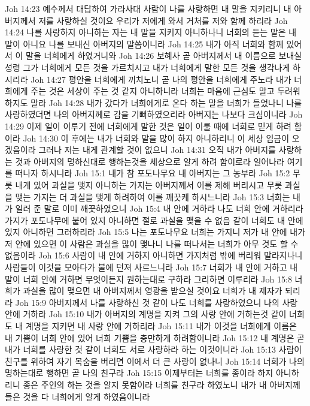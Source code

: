 Joh 14:23  예수께서 대답하여 가라사대 사람이 나를 사랑하면 내 말을 지키리니 내 아버지께서 저를 사랑하실 것이요 우리가 저에게 와서 거처를 저와 함께 하리라
Joh 14:24  나를 사랑하지 아니하는 자는 내 말을 지키지 아니하나니 너희의 듣는 말은 내 말이 아니요 나를 보내신 아버지의 말씀이니라
Joh 14:25  내가 아직 너희와 함께 있어서 이 말을 너희에게 하였거니와
Joh 14:26  보혜사 곧 아버지께서 내 이름으로 보내실 성령 그가 너희에게 모든 것을 가르치시고 내가 너희에게 말한 모든 것을 생각나게 하시리라
Joh 14:27  평안을 너희에게 끼치노니 곧 나의 평안을 너희에게 주노라 내가 너희에게 주는 것은 세상이 주는 것 같지 아니하니라 너희는 마음에 근심도 말고 두려워하지도 말라
Joh 14:28  내가 갔다가 너희에게로 온다 하는 말을 너희가 들었나니 나를 사랑하였더면 나의 아버지께로 감을 기뻐하였으리라 아버지는 나보다 크심이니라
Joh 14:29  이제 일이 이루기 전에 너희에게 말한 것은 일이 이룰 때에 너희로 믿게 하려 함이라
Joh 14:30  이 후에는 내가 너희와 말을 많이 하지 아니하리니 이 세상 임금이 오겠음이라 그러나 저는 내게 관계할 것이 없으니
Joh 14:31  오직 내가 아버지를 사랑하는 것과 아버지의 명하신대로 행하는것을 세상으로 알게 하려 함이로라 일어나라 여기를 떠나자 하시니라
Joh 15:1  내가 참 포도나무요 내 아버지는 그 농부라
Joh 15:2  무릇 내게 있어 과실을 맺지 아니하는 가지는 아버지께서 이를 제해 버리시고 무릇 과실을 맺는 가지는 더 과실을 맺게 하려하여 이를 깨끗케 하시느니라
Joh 15:3  너희는 내가 일러 준 말로 이미 깨끗하였으니
Joh 15:4  내 안에 거하라 나도 너희 안에 거하리라 가지가 포도나무에 붙어 있지 아니하면 절로 과실을 맺을 수 없음 같이 너희도 내 안에 있지 아니하면 그러하리라
Joh 15:5  나는 포도나무요 너희는 가지니 저가 내 안에 내가 저 안에 있으면 이 사람은 과실을 많이 맺나니 나를 떠나서는 너희가 아무 것도 할 수 없음이라
Joh 15:6  사람이 내 안에 거하지 아니하면 가지처럼 밖에 버리워 말라지나니 사람들이 이것을 모아다가 불에 던져 사르느니라
Joh 15:7  너희가 내 안에 거하고 내 말이 너희 안에 거하면 무엇이든지 원하는대로 구하라 그리하면 이루리라
Joh 15:8  너희가 과실을 많이 맺으면 내 아버지께서 영광을 받으실 것이요 너희가 내 제자가 되리라
Joh 15:9  아버지께서 나를 사랑하신 것 같이 나도 너희를 사랑하였으니 나의 사랑 안에 거하라
Joh 15:10  내가 아버지의 계명을 지켜 그의 사랑 안에 거하는것 같이 너희도 내 계명을 지키면 내 사랑 안에 거하리라
Joh 15:11  내가 이것을 너희에게 이름은 내 기쁨이 너희 안에 있어 너희 기쁨을 충만하게 하려함이니라
Joh 15:12  내 계명은 곧 내가 너희를 사랑한 것 같이 너희도 서로 사랑하라 하는 이것이니라
Joh 15:13  사람이 친구를 위하여 자기 목숨을 버리면 이에서 더 큰 사랑이 없나니
Joh 15:14  너희가 나의 명하는대로 행하면 곧 나의 친구라
Joh 15:15  이제부터는 너희를 종이라 하지 아니하리니 종은 주인의 하는 것을 알지 못함이라 너희를 친구라 하였노니 내가 내 아버지께 들은 것을 다 너희에게 알게 하였음이니라
